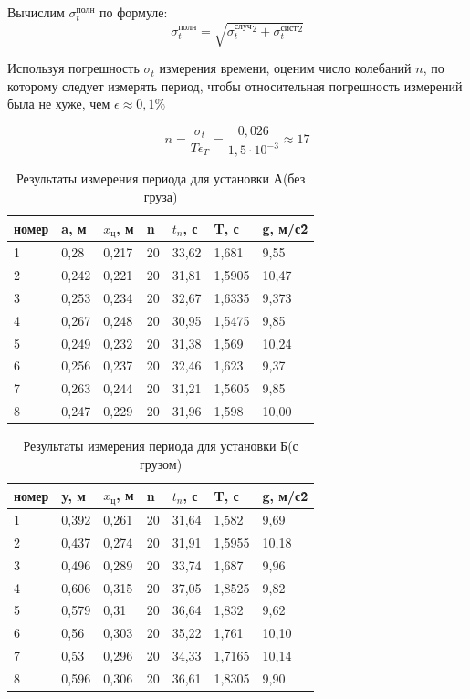 \documentclass[a4paper,12pt]{article}
\begin{document}
Вычислим $\sigma_{t}^{\mbox{полн}}$ по формуле:
\begin{equation}
\sigma_{t}^{\mbox{полн}}=\sqrt{\sigma_{t}^{\mbox{случ}}^2+\sigma_{t}^{\mbox{сист}}^2}
\end{equation}

Используя погрешность $\sigma_{t}$ измерения времени, оценим число колебаний $n$, по которому следует измерять период, чтобы относительная погрешность измерений была не хуже, чем $\epsilon \approx 0,1\%$

\begin{equation}
n=\frac{\sigma_{t}}{T\epsilon_T} = \frac{0,026} {1,5\cdot10^{-3}} \approx 17
\end{equation}

\begin{table}[H]
\centering
\caption{Результаты измерения периода для установки А(без груза)}
\begin{tabular}{|l|l|l|l|l|l|l|}
\hline
номер & a, м & $x_{\mbox{ц}}$, м & n & $t_n$, с & T, с & g, м/с\^2 \\ \hline
1 & 0,28 & 0,217 & 20 & 33,62 & 1,681 & 9,55\\ \hline
2 & 0,242 & 0,221 & 20 & 31,81 & 1,5905 & 10,47\\ \hline
3 & 0,253 & 0,234 & 20 & 32,67 & 1,6335 & 9,373\\ \hline
4 & 0,267 & 0,248 & 20 & 30,95 & 1,5475 & 9,85\\ \hline
5 & 0,249 & 0,232 & 20 & 31,38 & 1,569 & 10,24\\ \hline
6 & 0,256 & 0,237 & 20 & 32,46 & 1,623 & 9,37\\ \hline
7 & 0,263 & 0,244 & 20 & 31,21 & 1,5605 & 9,85\\ \hline
8 & 0,247 & 0,229 & 20 & 31,96 & 1,598 & 10,00\\ \hline
\end{tabular}
\end{table}

\begin{table}[H]
\centering
\caption{Результаты измерения периода для установки Б(с грузом)}
\begin{tabular}{|l|l|l|l|l|l|l|}
\hline
номер & y, м & $x_{\mbox{ц}}$, м & n & $t_n$, с & T, с & g, м/с\^2 \\ \hline
1 & 0,392 & 0,261 & 20 & 31,64 & 1,582 & 9,69\\ \hline
2 & 0,437 & 0,274 & 20 & 31,91 & 1,5955 & 10,18 \\ \hline
3 & 0,496 & 0,289 & 20 & 33,74 & 1,687 & 9,96 \\ \hline
4 & 0,606 & 0,315 & 20 & 37,05 & 1,8525 & 9,82 \\ \hline
5 & 0,579 & 0,31 & 20 & 36,64 & 1,832 & 9,62 \\ \hline
6 & 0,56 & 0,303 & 20 & 35,22 & 1,761 & 10,10 \\ \hline
7 & 0,53 & 0,296 & 20 & 34,33 & 1,7165 & 10,14 \\ \hline
8 & 0,596 & 0,306 & 20 & 36,61 & 1,8305 & 9,90 \\ \hline
\end{tabular}
\end{table}
\end{document}
